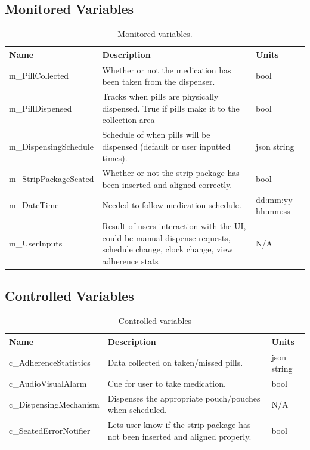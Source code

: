 \documentclass[12pt]{article}
\begin{document}
\subsection{Monitored Variables}
\begin{table}[htb!] \begin{center} \begin{adjustbox}{max width=\textwidth}
\small
\begin{tabular}{|p{}|p{}|p{}|}
 \hline
 \textbf{Name} & \textbf{Description} & \textbf{Units}\\
 \hline 
m\_PillCollected & Whether or not the medication has been taken from the dispenser. & bool\\
 \hline
m\_PillDispensed & Tracks when pills are physically dispensed. True if pills make it to the collection area  & bool\\
 \hline
m\_DispensingSchedule & Schedule of when pills will be dispensed (default or user inputted times). & json string \\
 \hline
m\_StripPackageSeated & Whether or not the strip package has been inserted and aligned correctly. & bool \\
 \hline
m\_DateTime & Needed to follow medication schedule. & dd:mm:yy hh:mm:ss\\
 \hline
m\_UserInputs & Result of users interaction with the UI, could be manual dispense requests, schedule change, clock change, view adherence stats & N/A\\
 \hline
\end{tabular} \end{adjustbox} \end{center} 
\caption{Monitored variables.} 
\end{table}

\pagebreak

\subsection{Controlled Variables}
\begin{table}[htb!] \begin{center} \begin{adjustbox}{max width=\textwidth} \small
\begin{tabular}{|p{}|p{}|p{}|}
 \hline
 \textbf{Name} & \textbf{Description} & \textbf{Units}\\
 \hline 
 c\_AdherenceStatistics & Data collected on taken/missed pills. & json string\\
 \hline
 c\_AudioVisualAlarm & Cue for user to take medication. & bool \\
 \hline
 c\_DispensingMechanism & Dispenses the appropriate pouch/pouches when scheduled. & N/A \\
 \hline
 c\_SeatedErrorNotifier & Lets user know if the strip package has not been inserted and aligned properly. & bool\\
 \hline
\end{tabular}\end{adjustbox} \end{center}
\caption{Controlled variables}
\end{table}
\end{document}
